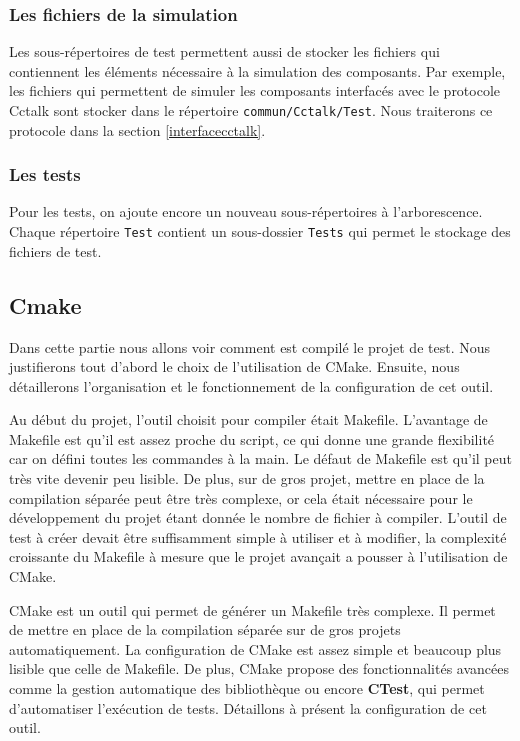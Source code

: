 \documentclass[a4paper]{article}
\begin{document}
\subsubsection{Les fichiers de la simulation}

Les sous-répertoires de test permettent aussi de stocker les fichiers qui
contiennent les éléments nécessaire à la simulation des composants. Par exemple,
les fichiers qui permettent de simuler les composants interfacés avec le
protocole Cctalk sont stocker dans le répertoire \verb|commun/Cctalk/Test|. Nous
traiterons ce protocole dans la section \ref{interfacecctalk}.

\subsubsection{Les tests}

Pour les tests, on ajoute encore un nouveau sous-répertoires à l'arborescence.
Chaque répertoire \verb|Test| contient un sous-dossier \verb|Tests| qui permet le
stockage des fichiers de test.

\subsection{Cmake}
\label{cmake}

Dans cette partie nous allons voir comment est compilé le projet de test. Nous
justifierons tout d'abord le choix de l'utilisation de CMake. Ensuite, nous
détaillerons l'organisation et le fonctionnement de la configuration de cet
outil.

Au début du projet, l'outil choisit pour compiler était Makefile. L'avantage de
Makefile est qu'il est assez proche du script, ce qui donne une grande
flexibilité car on défini toutes les commandes à la main. Le défaut de Makefile
est qu'il peut très vite devenir peu lisible. De plus, sur de gros projet, mettre
en place de la compilation séparée peut être très complexe, or cela était
nécessaire pour le développement du projet étant donnée le nombre de fichier à
compiler. L'outil de test à créer devait être suffisamment simple à utiliser et à
modifier, la complexité croissante du Makefile à mesure que le projet avançait a
pousser à l'utilisation de CMake.

CMake est un outil qui permet de générer un Makefile très complexe. Il permet de
mettre en place de la compilation séparée sur de gros projets automatiquement.
La configuration de CMake est assez simple et beaucoup plus lisible que celle de
Makefile. De plus, CMake propose des fonctionnalités avancées comme la gestion
automatique des bibliothèque ou encore \textbf{CTest}, qui permet d'automatiser
l'exécution de tests. Détaillons à présent la configuration de cet outil.
\end{document}
